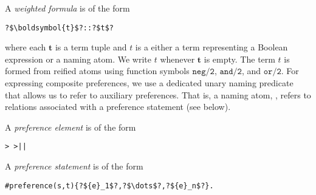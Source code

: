 A \emph{weighted formula} is of the form
\begin{lstlisting}[numbers=none,escapechar=?]
?$\boldsymbol{t}$?::?$t$?
\end{lstlisting}
where each $\boldsymbol{t}$ is a term tuple and $t$ is a either a term representing a Boolean expression or a naming atom.
We write $t$ whenever $\boldsymbol{t}$ is empty.
The term
$t$ is formed from reified atoms using function symbols $\mathtt{neg/2}$, $\mathtt{and/2}$, and $\mathtt{or/2}$.
%
For expressing composite preferences,
we use a dedicated unary naming predicate  that allows us to refer to auxiliary preferences.
That is, a naming atom, , refers to relations associated with a preference statement  (see below).

A \emph{preference element} is of the form
\begin{lstlisting}[numbers=none,escapechar=?]
> >||
\end{lstlisting}

A \emph{preference statement}  is of the form
%
\begin{lstlisting}[numbers=none,escapechar=?]
#preference(s,t){?${e}_1$?,?$\dots$?,?${e}_n$?}.
\end{lstlisting}
%


